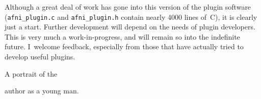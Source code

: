\label{Call}
Although a great deal of work has gone into this version of the
plugin software ({\tt afni\_plugin.c} and {\tt afni\_plugin.h}
contain nearly 4000 lines of~C), it is clearly just a start.
Further development will depend on the needs of plugin developers.
This is very much a work-in-progress, and will remain so into
the indefinite future.  I~welcome feedback, especially from
those that have actually tried to develop useful plugins.

\vspace{3ex}
\begin{samepage}
\centerline{\epsfxsize=1.5in}\vspace{1ex}
\centerline{\sf A portrait of the}
\centerline{\sf author as a young man.}
\end{samepage}


